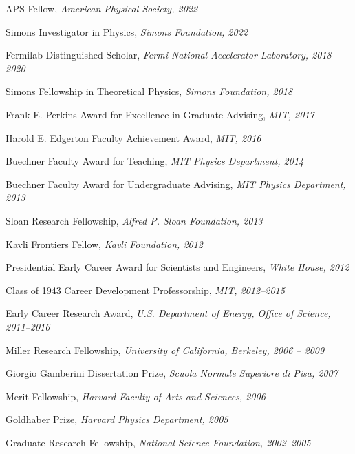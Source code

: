 \bbl
\item APS Fellow, \textit{American Physical Society, 2022}
\item Simons Investigator in Physics, \textit{Simons Foundation, 2022}
\item Fermilab Distinguished Scholar, \textit{Fermi National Accelerator Laboratory, 2018--2020}
\item Simons Fellowship in Theoretical Physics, \textit{Simons Foundation, 2018}
\item Frank E. Perkins Award for Excellence in Graduate Advising, \textit{MIT, 2017}
\item Harold E. Edgerton Faculty Achievement Award, \textit{MIT, 2016}
\item Buechner Faculty Award for Teaching, \textit{MIT Physics Department, 2014}
\item Buechner Faculty Award for Undergraduate Advising, \textit{MIT Physics Department, 2013}
\item Sloan Research Fellowship, \textit{Alfred P. Sloan Foundation, 2013}
\item Kavli Frontiers Fellow, \textit{Kavli Foundation, 2012}
\item Presidential Early Career Award for Scientists and Engineers, \textit{White House, 2012}
\item Class of 1943 Career Development Professorship, \textit{MIT, 2012--2015}
\item Early Career Research Award, \textit{U.S. Department of Energy, Office of Science, 2011--2016}
\item Miller Research Fellowship, \textit{University of California, Berkeley, 2006 -- 2009}
\item Giorgio Gamberini Dissertation Prize, \textit{Scuola Normale Superiore di Pisa, 2007}
\item Merit Fellowship, \textit{Harvard Faculty of Arts and Sciences, 2006}
\item Goldhaber Prize, \textit{Harvard Physics Department, 2005}
\item Graduate Research Fellowship, \textit{National Science Foundation, 2002--2005}
\el
